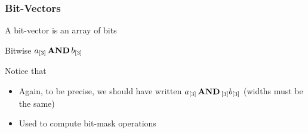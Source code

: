 \begin{frame}
  \frametitle{Bit-Vectors}
  
  A bit-vector is an array of bits 
  \smallskip \\
  \begin{center}
  \scalebox{.3}{}
  \end{center} 
  \vfill

  Bitwise $a_{[3]} \,{\bf AND}\, b_{[3]}$ 
  \smallskip \\
  \begin{center}
  \scalebox{.3}{} 
  \end{center}

  \vfill
  \pause

  Notice that
  \begin{itemize}
    \item Again, to be precise, we should have written $a_{[3]} \,{\bf AND}\,_{[3]} b_{[3]}$ (widths must be the same)
    \item Used to compute bit-mask operations
  \end{itemize}

\end{frame}

